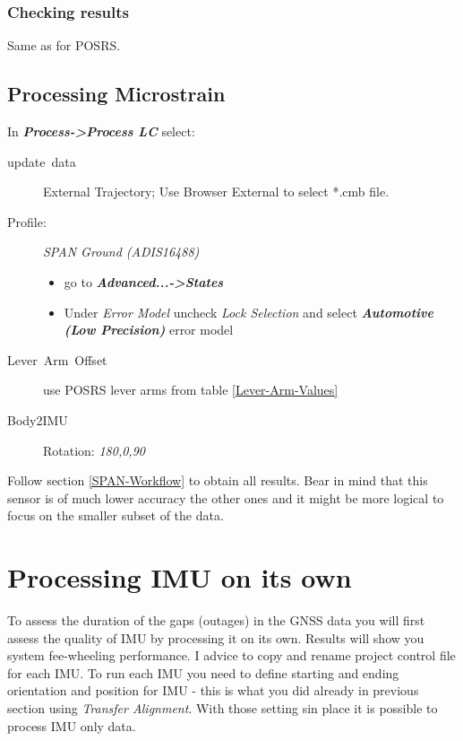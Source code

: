 \documentclass[british]{book}
\begin{document}
\subsection{Checking results}

Same as for POSRS.

\section{Processing Microstrain}\label{sub:Processing-Microstrain}

In \textbf{\emph{Process->Process LC}} select:
\begin{description}
	\item [{update~data}] External Trajectory; Use Browser External to select {*}.cmb file.
	\item [{Profile:}] \emph{SPAN Ground (ADIS16488) }
		\begin{itemize}
			\item go to \textbf{\emph{Advanced...->States}}
			\item Under \emph{Error Model} uncheck \emph{Lock Selection} and select \textbf{\emph{Automotive (Low Precision)}} error model
		\end{itemize}
	\item [{Lever~Arm~Offset}] use POSRS lever arms from table \ref{Lever-Arm-Values}
	\item [{Body2IMU}] Rotation: \emph{180,0,90 }
\end{description}

Follow section \ref{SPAN-Workflow} to obtain all results. Bear in mind that this sensor is of much lower accuracy the other ones and it might be more logical to focus on the smaller subset of the data.

\chapter{Processing IMU on its own}\label{Processing-IMU-on-its-own}

To assess the duration of the gaps (outages) in the GNSS data you will first assess the quality of IMU by processing it on its own. Results will show you system fee-wheeling performance. I advice to copy and rename project control file for each IMU. To run each IMU you need to define starting and ending orientation and position for IMU - this is what you did already in previous section using \emph{Transfer Alignment}. With those setting sin place it is possible to process IMU only data. 
\end{document}
